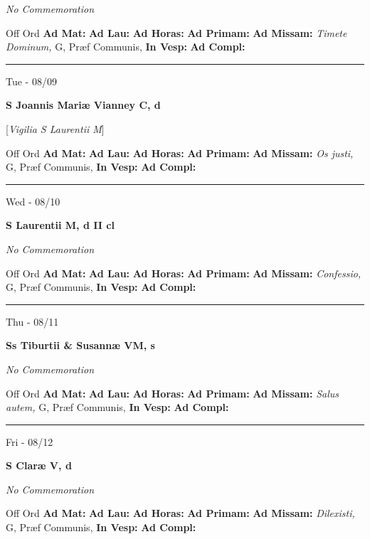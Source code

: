 \documentclass[letterpaper, 10pt]{article}
\begin{document}
\textit{No Commemoration}\begin{justify}
Off Ord
\textbf{Ad Mat: }
\textbf{Ad Lau: }
\textbf{Ad Horas: }
\textbf{Ad Primam: }
\textbf{Ad Missam:} \textit{Timete Dominum, } G, Præf Communis, 
\textbf{In Vesp: }
\textbf{Ad Compl: }\end{justify}



\hrule
\begin{center}
Tue - 08/09
\end{center}\textbf{ \large S Joannis Mariæ Vianney C, \textnormal{\normalsize d}}

[\textit{Vigilia S Laurentii M}]
\begin{justify}
Off Ord
\textbf{Ad Mat: }
\textbf{Ad Lau: }
\textbf{Ad Horas: }
\textbf{Ad Primam: }
\textbf{Ad Missam:} \textit{Os justi, } G, Præf Communis, 
\textbf{In Vesp: }
\textbf{Ad Compl: }\end{justify}



\hrule
\begin{center}
Wed - 08/10
\end{center}\textbf{ \large S Laurentii M, \textnormal{\normalsize d II cl}}

\textit{No Commemoration}\begin{justify}
Off Ord
\textbf{Ad Mat: }
\textbf{Ad Lau: }
\textbf{Ad Horas: }
\textbf{Ad Primam: }
\textbf{Ad Missam:} \textit{Confessio, } G, Præf Communis, 
\textbf{In Vesp: }
\textbf{Ad Compl: }\end{justify}



\hrule
\begin{center}
Thu - 08/11
\end{center}\textbf{ \large Ss Tiburtii \& Susannæ VM, \textnormal{\normalsize s}}

\textit{No Commemoration}\begin{justify}
Off Ord
\textbf{Ad Mat: }
\textbf{Ad Lau: }
\textbf{Ad Horas: }
\textbf{Ad Primam: }
\textbf{Ad Missam:} \textit{Salus autem, } G, Præf Communis, 
\textbf{In Vesp: }
\textbf{Ad Compl: }\end{justify}



\hrule
\begin{center}
Fri - 08/12
\end{center}\textbf{ \large S Claræ V, \textnormal{\normalsize d}}

\textit{No Commemoration}\begin{justify}
Off Ord
\textbf{Ad Mat: }
\textbf{Ad Lau: }
\textbf{Ad Horas: }
\textbf{Ad Primam: }
\textbf{Ad Missam:} \textit{Dilexisti, } G, Præf Communis, 
\textbf{In Vesp: }
\textbf{Ad Compl: }\end{justify}
\end{document}
